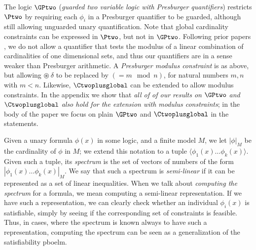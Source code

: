 The logic $\GPtwo$ (\emph{guarded two variable logic with Presburger quantifiers}) restricts $\Ptwo$ by requiring each $\phi_i$ in a Presburger quantifier to be guarded, although still allowing unguarded unary quantification.
Note that global cardinality constraints can be expressed in $\Ptwo$, but not in $\GPtwo$.
Following prior papers \cite{twovarpres}, we do not allow a quantifier that tests the modulus of a linear combination of
cardinalities of one dimensional sets, and thus our quantifiers are in a sense weaker than Presburger arithmetic.
A \emph{Presburger modulus constraint} is as above, but allowing $\circledast\ \delta$ to be replaced by 
$(= m \mod n)$, for natural numbers $m, n$ with $m < n$.
Likewise, $\Ctwoplusglobal$ can be extended to allow modulus constraints. 
In the appendix we show that \emph{all of of our results on $\GPtwo$ and $\Ctwoplusglobal$ also hold for the extension with modulus constraints}; in the body of the paper we focus on plain $\GPtwo$ and $\Ctwoplusglobal$ in the statements. 


Given a unary formula $\phi(x)$ in some logic, and a finite model $M$, we let $|\phi|_M$ be the cardinality of $\phi$ in $M$; we extend this notation to a tuple $\langle \phi_1(x) \ldots \phi_k(x) \rangle$.
Given such a tuple, its \emph{spectrum} is the set of vectors of numbers of the form  $| \phi_1(x) \ldots \phi_k(x) |_M$. We say that such a spectrum is \emph{semi-linear} if it can be represented as a set of linear inequalities. When we talk about \emph{computing the spectrum} for a formula, we mean computing a semi-linear representation. 
If we have such a representation, we can clearly check whether an individual $\phi_i(x)$ is satisfiable, simply by seeing if the corresponding set of constraints is feasible. Thus, in cases, where the spectrum is known always to have such a representation, computing the spectrum can be seen as a generalization of the satisfiability pboelm.


